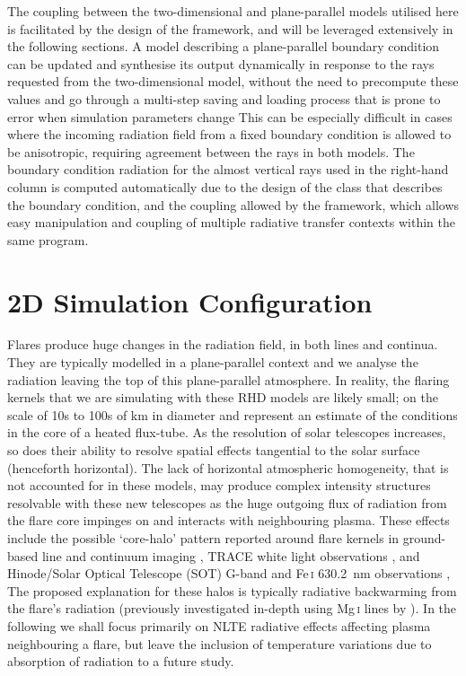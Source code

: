 The coupling between the two-dimensional and plane-parallel models utilised here is facilitated by the design of the \Lw{} framework, and will be leveraged extensively in the following sections.
A \Lw{} model describing a plane-parallel boundary condition can be updated and synthesise its output dynamically in response to the rays requested from the two-dimensional model, without the need to precompute these values and go through a multi-step saving and loading process that is prone to error when simulation parameters change
This can be especially difficult in cases where the incoming radiation field from a fixed boundary condition is allowed to be anisotropic, requiring agreement between the rays in both models.
The boundary condition radiation for the almost vertical rays used in the right-hand column is computed automatically due to the design of the class that describes the boundary condition, and the coupling allowed by the framework, which allows easy manipulation and coupling of multiple radiative transfer contexts within the same program.

\section{2D Simulation Configuration}

Flares produce huge changes in the radiation field, in both lines and continua.
They are typically modelled in a plane-parallel context and we analyse the radiation leaving the top of this plane-parallel atmosphere.
In reality, the flaring kernels that we are simulating with these RHD models are likely small; on the scale of 10s to 100s of \si{\kilo\metre} in diameter \citep{Jing2016} and represent an estimate of the conditions in the core of a heated flux-tube.
As the resolution of solar telescopes increases, so does their ability to resolve spatial effects tangential to the solar surface (henceforth horizontal).
The lack of horizontal atmospheric homogeneity, that is not accounted for in these models, may produce complex intensity structures resolvable with these new telescopes as the huge outgoing flux of radiation from the flare core impinges on and interacts with neighbouring plasma.
These effects include the possible `core-halo' pattern reported around flare kernels in ground-based line and continuum imaging \citep{Neidig1993,Xu2006}, TRACE white light observations \citep{Hudson2006}, and Hinode/Solar Optical Telescope (SOT) G-band and Fe\,\textsc{i} \SI{630.2}{\nano\m} observations \citep{Isobe2007},
The proposed explanation for these halos is typically radiative backwarming from the flare's radiation (previously investigated in-depth using Mg\,\textsc{i} lines by \citet{Metcalf1990}).
In the following we shall focus primarily on NLTE radiative effects affecting plasma neighbouring a flare, but leave the inclusion of temperature variations due to absorption of radiation to a future study.

